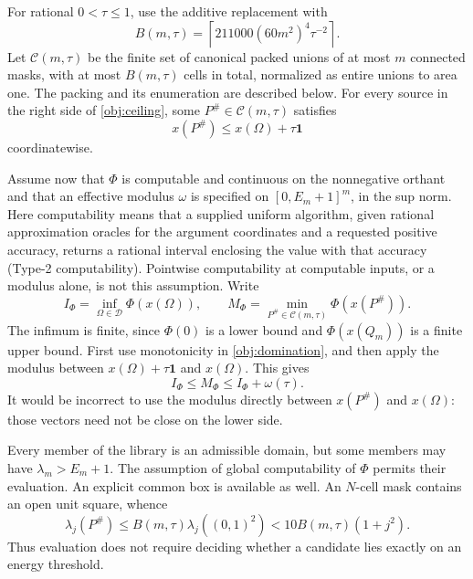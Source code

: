 \documentclass[11pt,reqno]{amsart}
\numberwithin{equation}{section}
\newcommand{\Om}{\Omega}
\begin{document}
For rational $0<\tau\le1$, use the additive replacement with
\begin{equation}\label{obj:budget}
 B(m,\tau)=\left\lceil211000(60m^2)^4\tau^{-2}\right\rceil.
\end{equation}
Let $\mathcal C(m,\tau)$ be the finite set of canonical packed
unions of at most $m$ connected masks, with at most $B(m,\tau)$
cells in total, normalized as entire unions to area one. The packing
and its enumeration are described below. For every source in the
right side of \eqref{obj:ceiling}, some $P^\#\in\mathcal C(m,\tau)$
satisfies
\begin{equation}\label{obj:domination}
 x(P^\#)\le x(\Om)+\tau\mathbf 1
\end{equation}
coordinatewise.

Assume now that $\Phi$ is computable and continuous on the
nonnegative orthant and that an effective modulus $\omega$ is
specified on $[0,E_m+1]^m$, in the sup norm. Here computability
means that a supplied uniform algorithm, given rational approximation
oracles for the argument coordinates and a requested positive
accuracy, returns a rational interval enclosing the value with
that accuracy (Type-2 computability). Pointwise computability at
computable inputs, or a modulus alone, is not this assumption. Write
\[
 I_\Phi=\inf_{\Om\in\mathcal D}\Phi(x(\Om)),\qquad
 M_\Phi=\min_{P^\#\in\mathcal C(m,\tau)}\Phi(x(P^\#)).
\]
The infimum is finite, since $\Phi(0)$ is a lower bound and
$\Phi(x(Q_m))$ is a finite upper bound. First use monotonicity in
\eqref{obj:domination}, and then apply the modulus between
$x(\Om)+\tau\mathbf1$ and $x(\Om)$. This gives
\begin{equation}\label{obj:value}
 I_\Phi\le M_\Phi\le I_\Phi+\omega(\tau).
\end{equation}
It would be incorrect to use the modulus directly between
$x(P^\#)$ and $x(\Om)$: those vectors need not be close on the
lower side.

Every member of the library is an admissible domain, but some
members may have $\lambda_m>E_m+1$. The assumption of global
computability of $\Phi$ permits their evaluation. An explicit
common box is available as well. An $N$-cell mask contains an open
unit square, whence
\[
 \lambda_j(P^\#)\le B(m,\tau)\lambda_j((0,1)^2)
              <10B(m,\tau)(1+j^2).
\]
Thus evaluation does not require deciding whether a candidate
lies exactly on an energy threshold.
\end{document}
